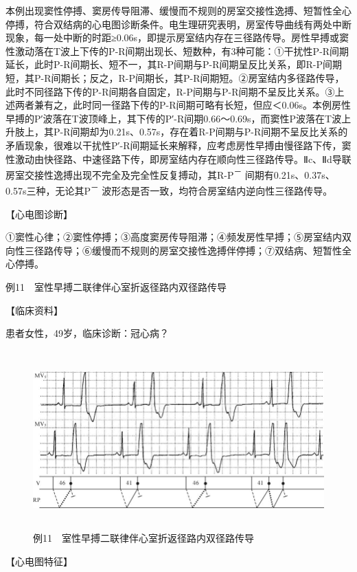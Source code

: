 本例出现窦性停搏、窦房传导阻滞、缓慢而不规则的房室交接性逸搏、短暂性全心停搏，符合双结病的心电图诊断条件。电生理研究表明，房室传导曲线有两处中断现象，每一处中断的时距≥0.06s，即提示房室结内存在三径路传导。房性早搏或窦性激动落在T波上下传的P-R间期出现长、短数种，有3种可能：①干扰性P-R间期延长，此时P-R间期长、短不一，其R-P间期与P-R间期呈反比关系，即R-P间期短，其P-R间期长；反之，R-P间期长，其P-R间期短。②房室结内多径路传导，此时不同径路下传的P-R间期各自固定，R-P间期与P-R间期不呈反比关系。③上述两者兼有之，此时同一径路下传的P-R间期可略有长短，但应＜0.06s。本例房性早搏的P′波落在T波顶峰上，其下传的P′-R间期0.66～0.69s，而窦性P波落在T波上升肢上，其P-R间期却为0.21s、0.57s，存在着R-P间期与P-R间期不呈反比关系的矛盾现象，很难以干扰性P′-R间期延长来解释，应考虑房性早搏由慢径路下传，窦性激动由快径路、中速径路下传，即房室结内存在顺向性三径路传导。Ⅱc、Ⅱd导联房室交接性逸搏出现不完全及完全性反复搏动，其R-P\textsuperscript{－}
间期有0.21s、0.37s、0.57s三种，无论其P\textsuperscript{－}
波形态是否一致，均符合房室结内逆向性三径路传导。

【心电图诊断】

①窦性心律；②窦性停搏；③高度窦房传导阻滞；④频发房性早搏；⑤房室结内双向性三径路传导；⑥缓慢而不规则的房室交接性逸搏伴停搏；⑦双结病、短暂性全心停搏。

例11　室性早搏二联律伴心室折返径路内双径路传导

【临床资料】

患者女性，49岁，临床诊断：冠心病？

\begin{figure}[!htbp]
 \centering
 \includegraphics[width=5.73958in,height=2.70833in]{./images/Image00769.jpg}
 \captionsetup{justification=centering}
 \caption{例11　室性早搏二联律伴心室折返径路内双径路传导}
 \label{fig50-11}
  \end{figure} 

【心电图特征】

